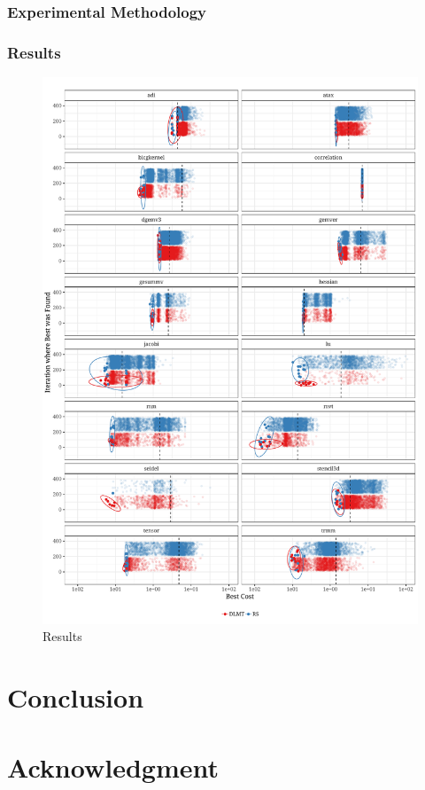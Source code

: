 \documentclass[conference]{IEEEtran}
\begin{document}
\subsubsection{Experimental Methodology}
\label{sec:orgaab9e17}
\subsubsection{Results}
\label{sec:org402fb25}
\begin{center}
\begin{figure}[p]
\centering
\includegraphics[width=.9\textwidth]{./img/iteration_best_comparison.pdf}
\caption{Results}
\end{figure}
\end{center}
\clearpage
\section{Conclusion}
\label{sec:org8cea8dc}
\section*{Acknowledgment}
\label{sec:orgcbda47f}


\end{document}
